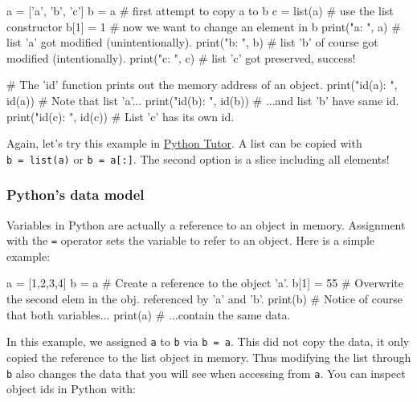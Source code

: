 \documentclass[12pt]{article} \newif\ifsolution\solutiontrue %
\begin{document}
\begin{python}
a = ['a', 'b', 'c']
b = a       # first attempt to copy a to b
c = list(a) # use the list constructor
b[1] = 1    # now we want to change an element in b
print("a: ", a)  # list 'a' got modified (unintentionally).
print("b: ", b)  # list 'b' of course got modified (intentionally).
print("c: ", c)  # list 'c' got preserved, success!

# The 'id' function prints out the memory address of an object.
print("id(a): ", id(a))  # Note that list 'a'...
print("id(b): ", id(b))  # ...and list 'b' have same id.
print("id(c): ", id(c))  # List 'c' has its own id.
\end{python}

Again, let's try this example in
\href{http://pythontutor.com/iframe-embed.html\#code=a+\%3D+\%5B'a',+'b',+'c'\%5D\%0Ab+\%3D+a+++++++\%23+first+attempt+to+copy+a+to+b\%0Ac+\%3D+list(a\%29+\%23+use+the+list+constructor\%0Ab\%5B1\%5D+\%3D+1++++\%23+now+we+want+to+change+an+element+in+b\&origin=opt-frontend.js\&cumulative=false\&heapPrimitives=false\&textReferences=false\&py=3\&rawInputLstJSON=\%5B\%5D\&curInstr=0\&codeDivWidth=350\&codeDivHeight=400}{Python
Tutor}.
A list can be copied with \texttt{b\ =\ list(a)} or
\texttt{b\ =\ a{[}:{]}}. The second option is a slice including all
elements!

\vspace{-10pt}
\subsubsection{Python's data model}\label{pythons-data-model}

Variables in Python are actually a reference to an object in memory.
Assignment with the \texttt{=} operator sets the variable to refer to an
object. Here is a simple example:

\begin{python}
a = [1,2,3,4]
b = a          # Create a reference to the object 'a'.
b[1] = 55      # Overwrite the second elem in the obj. referenced by 'a' and 'b'.
print(b)       # Notice of course that both variables...
print(a)       # ...contain the same data.
\end{python}

In this example, we assigned \texttt{a} to \texttt{b} via
\texttt{b\ =\ a}. This did not copy the data, it only copied the
reference to the list object in memory. Thus modifying the list through
\texttt{b} also changes the data that you will see when accessing from
\texttt{a}. You can inspect object ids in Python with:
\end{document}
